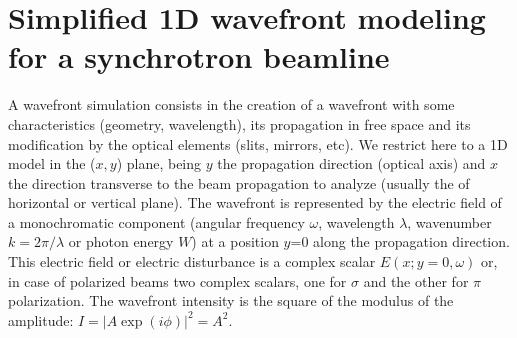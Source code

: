 \documentclass{iucr}              %
\begin{document}


\section{Simplified 1D wavefront modeling for a synchrotron beamline}


A wavefront simulation consists in the creation of a wavefront with some characteristics (geometry, wavelength), its propagation in free space and its modification by the optical elements (slits, mirrors, etc). We restrict here to a 1D model in the ($x,y$) plane, being $y$ the propagation direction (optical axis) and $x$ the direction transverse to the beam propagation to analyze (usually the of horizontal or vertical plane). The wavefront is represented by the electric field of a monochromatic component (angular frequency $\omega$, wavelength $\lambda$, wavenumber $k = 2 \pi / \lambda$ or photon energy $W$) at a position $y$=0 along the propagation direction. This electric field or electric disturbance is a complex scalar $E(x;y=0,\omega)$ or, in case of polarized beams two complex scalars, one for $\sigma$ and the other for $\pi$ polarization. The wavefront intensity is the square of the modulus of the amplitude: $I=|A \exp{(i\phi)}|^2=A^2$. 
\end{document}
